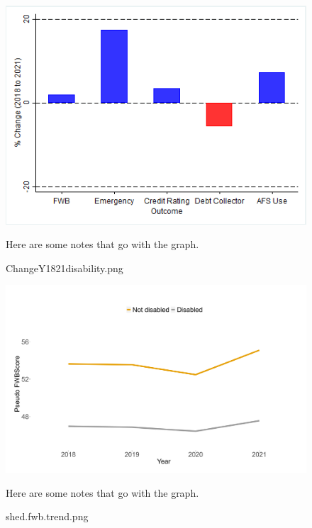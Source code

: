 \documentclass[12pt]{article}
\begin{document}
\begin{figure}[!ht]\label{ChangeY_18_21_disability.png}
\caption{ChangeY1821disability.png}
\centering
\includegraphics[scale=0.65]{ChangeY_18_21_disability.png}
\medskip 
\begin{minipage}{0.65\textwidth} 
{\footnotesize Here are some notes that go with the graph.  \par}
\end{minipage}
\end{figure}

\begin{figure}[!ht]\label{shed.fwb.trend.png}
\caption{shed.fwb.trend.png}
\centering
\includegraphics[scale=0.3]{shed.fwb.trend.png}
\medskip 
\begin{minipage}{0.65\textwidth} 
{\footnotesize Here are some notes that go with the graph.  \par}
\end{minipage}
\end{figure}
\end{document}
